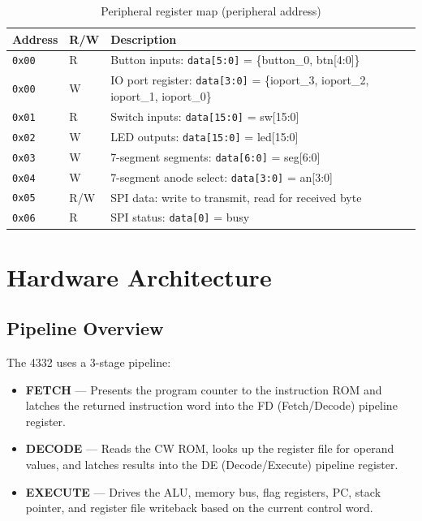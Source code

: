 \documentclass[a4paper,12pt]{report}
\begin{document}
\begin{table}[htbp]
\centering
\caption{Peripheral register map (peripheral address)}
\begin{tabularx}{\textwidth}{llX}
    \toprule
    \textbf{Address} & \textbf{R/W} & \textbf{Description} \\
    \midrule
    \texttt{0x00} & R   & Button inputs: \texttt{data[5:0]} = \{button\_0, btn[4:0]\} \\
    \texttt{0x00} & W   & IO port register: \texttt{data[3:0]} = \{ioport\_3, ioport\_2, ioport\_1, ioport\_0\} \\
    \texttt{0x01} & R   & Switch inputs: \texttt{data[15:0]} = sw[15:0] \\
    \texttt{0x02} & W   & LED outputs: \texttt{data[15:0]} = led[15:0] \\
    \texttt{0x03} & W   & 7-segment segments: \texttt{data[6:0]} = seg[6:0] \\
    \texttt{0x04} & W   & 7-segment anode select: \texttt{data[3:0]} = an[3:0] \\
    \texttt{0x05} & R/W & SPI data: write to transmit, read for received byte \\
    \texttt{0x06} & R   & SPI status: \texttt{data[0]} = busy \\
    \bottomrule
\end{tabularx}
\end{table}

\chapter{Hardware Architecture}
\label{ch:pipeline}

\section{Pipeline Overview}

The 4332 uses a 3-stage pipeline:

\begin{itemize}
    \item \textbf{FETCH} --- Presents the program counter to the instruction ROM and latches the returned instruction word into the FD (Fetch/Decode) pipeline register.
    \item \textbf{DECODE} --- Reads the CW ROM, looks up the register file for operand values, and latches results into the DE (Decode/Execute) pipeline register.
    \item \textbf{EXECUTE} --- Drives the ALU, memory bus, flag registers, PC, stack pointer, and register file writeback based on the current control word.
\end{itemize}
\end{document}

